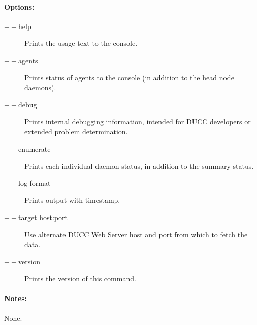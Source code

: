     \paragraph{Options:}
    \begin{description}
    	\item[$--$help]
          Prints the usage text to the console. 
        \item[$--$agents]
          Prints status of agents to the console (in addition to the head node daemons). 
        \item[$--$debug ]          
          Prints internal debugging information, intended for DUCC developers or extended problem determination.      
        \item[$--$enumerate ]          
          Prints each individual daemon status, in addition to the summary status.    
        \item[$--$log-format ]          
          Prints output with timestamp.  
        \item[$--$target host:port ]          
          Use alternate DUCC Web Server host and port from which to fetch the data.  
        \item[$--$version ]          
          Prints the version of this command.                                                                                                    
     \end{description}
        
    \paragraph{Notes:}
    None.
    